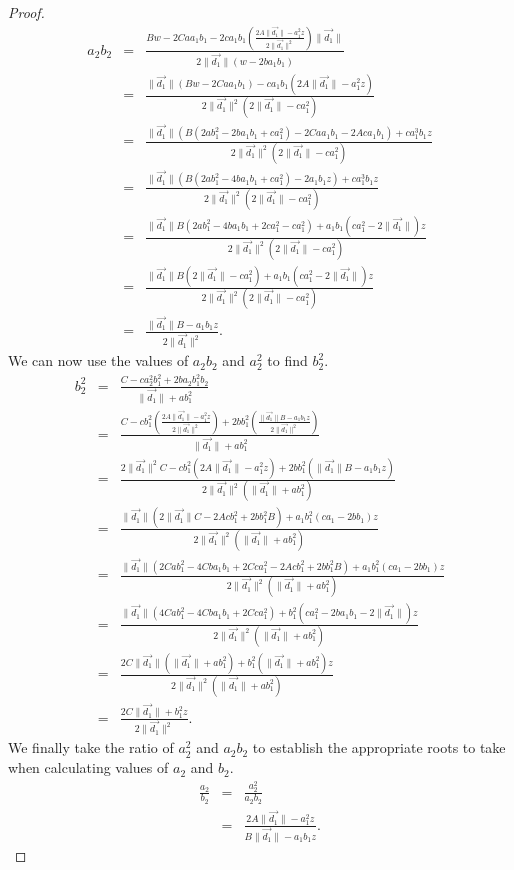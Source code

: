 \begin{proof}
\begin{eqnarray*}
a_2b_2 & = & \frac{Bw - 2Caa_1b_1 - 2ca_1b_1\left(\frac{2A\|\vec{d_1}\| - a_1^2z}{2\|\vec{d_1}\|^2} \right)\|\vec{d_1}\|}{2\|\vec{d_1}\|(w - 2ba_1b_1)}\\
       & = & \frac{\|\vec{d_1}\|(Bw - 2Caa_1b_1) - ca_1b_1(2A\|\vec{d_1}\| - a_1^2z)}{2\|\vec{d_1}\|^2(2\|\vec{d_1}\| - ca_1^2)}\\
       & = & \frac{\|\vec{d_1}\|(B(2ab_1^2 - 2ba_1b_1 + ca_1^2) - 2Caa_1b_1 - 2Aca_1b_1) + ca_1^3b_1z}{2\|\vec{d_1}\|^2(2\|\vec{d_1}\| - ca_1^2)}\\
       & = & \frac{\|\vec{d_1}\|(B(2ab_1^2 - 4ba_1b_1 + ca_1^2) - 2a_1b_1z) + ca_1^3b_1z}{2\|\vec{d_1}\|^2(2\|\vec{d_1}\| - ca_1^2)}\\
       & = & \frac{\|\vec{d_1}\|B(2ab_1^2 - 4ba_1b_1 + 2ca_1^2 - ca_1^2) + a_1b_1(ca_1^2 - 2\|\vec{d_1}\|)z}{2\|\vec{d_1}\|^2(2\|\vec{d_1}\| - ca_1^2)}\\
       & = & \frac{\|\vec{d_1}\|B(2\|\vec{d_1}\| - ca_1^2) + a_1b_1(ca_1^2 - 2\|\vec{d_1}\|)z}{2\|\vec{d_1}\|^2(2\|\vec{d_1}\| - ca_1^2)}\\
       & = & \frac{\|\vec{d_1}\|B - a_1b_1z}{2\|\vec{d_1}\|^2}.
\end{eqnarray*}
We can now use the values of $a_2b_2$ and $a_2^2$ to find $b_2^2$.
\begin{eqnarray*}
b_2^2 & = & \frac{C - ca_2^2b_1^2 + 2ba_2b_1^2b_2}{\|\vec{d_1}\| + ab_1^2}\\
      & = & \frac{C - cb_1^2\left(\frac{2A\|\vec{d_1}\| - a_1^2z}{2\|\vec{d_1}\|^2} \right) + 2bb_1^2\left(\frac{\|\vec{d_1}\|B - a_1b_1z}{2\|\vec{d_1}\|^2}\right)}{\|\vec{d_1}\| + ab_1^2}\\
      & = & \frac{2\|\vec{d_1}\|^2C - cb_1^2(2A\|\vec{d_1}\| - a_1^2z) + 2bb_1^2(\|\vec{d_1}\|B - a_1b_1z)}{2\|\vec{d_1}\|^2(\|\vec{d_1}\| + ab_1^2)}\\
      & = & \frac{\|\vec{d_1}\|(2\|\vec{d_1}\|C - 2Acb_1^2 + 2bb_1^2B) + a_1b_1^2(ca_1 - 2bb_1)z}{2\|\vec{d_1}\|^2(\|\vec{d_1}\| + ab_1^2)}\\
      & = & \frac{\|\vec{d_1}\|(2Cab_1^2 - 4Cba_1b_1 + 2Cca_1^2 - 2Acb_1^2 + 2bb_1^2B) + a_1b_1^2(ca_1 - 2bb_1)z}{2\|\vec{d_1}\|^2(\|\vec{d_1}\| + ab_1^2)}\\
      & = & \frac{\|\vec{d_1}\|(4Cab_1^2 - 4Cba_1b_1 + 2Cca_1^2) + b_1^2(ca_1^2 - 2ba_1b_1 - 2\|\vec{d_1}\|)z}{2\|\vec{d_1}\|^2(\|\vec{d_1}\| + ab_1^2)}\\
      & = & \frac{2C\|\vec{d_1}\|(\|\vec{d_1}\| + ab_1^2) + b_1^2(\|\vec{d_1}\| + ab_1^2)z}{2\|\vec{d_1}\|^2(\|\vec{d_1}\| + ab_1^2)}\\
      & = & \frac{2C\|\vec{d_1}\| + b_1^2z}{2\|\vec{d_1}\|^2}.
\end{eqnarray*}
We finally take the ratio of $a_2^2$ and $a_2b_2$ to establish the appropriate roots to take when calculating values of $a_2$ and $b_2$.
\begin{eqnarray*}
\frac{a_2}{b_2} & = & \frac{a_2^2}{a_2b_2}\\
                & = & \frac{2A\|\vec{d_1}\| - a_1^2z}{B\|\vec{d_1}\| - a_1b_1z}.
\end{eqnarray*}
\end{proof}
